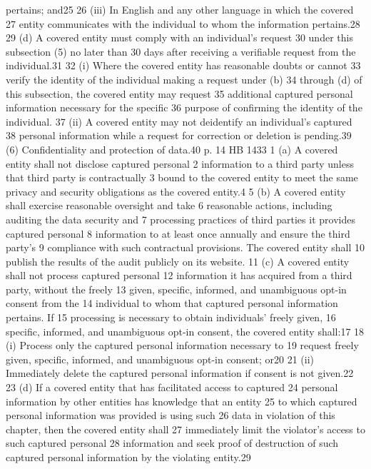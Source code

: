 pertains; and25
26 (iii) In English and any other language in which the covered
27 entity communicates with the individual to whom the information
pertains.28
29 (d) A covered entity must comply with an individual's request
30 under this subsection (5) no later than 30 days after receiving a
verifiable request from the individual.31
32 (i) Where the covered entity has reasonable doubts or cannot
33 verify the identity of the individual making a request under (b)
34 through (d) of this subsection, the covered entity may request
35 additional captured personal information necessary for the specific
36 purpose of confirming the identity of the individual.
37 (ii) A covered entity may not deidentify an individual's captured
38 personal information while a request for correction or deletion is
pending.39
(6) Confidentiality and protection of data.40
p. 14 HB 1433
1 (a) A covered entity shall not disclose captured personal
2 information to a third party unless that third party is contractually
3 bound to the covered entity to meet the same privacy and security
obligations as the covered entity.4
5 (b) A covered entity shall exercise reasonable oversight and take
6 reasonable actions, including auditing the data security and
7 processing practices of third parties it provides captured personal
8 information to at least once annually and ensure the third party's
9 compliance with such contractual provisions. The covered entity shall
10 publish the results of the audit publicly on its website.
11 (c) A covered entity shall not process captured personal
12 information it has acquired from a third party, without the freely
13 given, specific, informed, and unambiguous opt-in consent from the
14 individual to whom that captured personal information pertains. If
15 processing is necessary to obtain individuals' freely given,
16 specific, informed, and unambiguous opt-in consent, the covered
entity shall:17
18 (i) Process only the captured personal information necessary to
19 request freely given, specific, informed, and unambiguous opt-in
consent; or20
21 (ii) Immediately delete the captured personal information if
consent is not given.22
23 (d) If a covered entity that has facilitated access to captured
24 personal information by other entities has knowledge that an entity
25 to which captured personal information was provided is using such
26 data in violation of this chapter, then the covered entity shall
27 immediately limit the violator's access to such captured personal
28 information and seek proof of destruction of such captured personal
information by the violating entity.29
